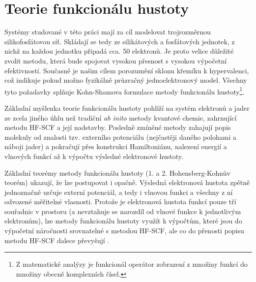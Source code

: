 \documentclass[
  digital, %
  table,   %
  lof,     %
  lot,     %
  oneside,
]{fithesis3}
\begin{document}
\section{Teorie funkcionálu hustoty}
Systémy studované v této práci mají za cíl modelovat trojrozměrnou silikofosfátovou síť. Skládají se tedy ze silikátových a fosfátových jednotek, z nichž na každou jednotku připadá cca. 50 elektronů. Je proto velice důležité zvolit metodu, která bude spojovat vysokou přesnost s vysokou výpočetní efektivností. Současně je našim cílem porozumění sklonu křemíku k hypervalenci, což indikuje pokud možno fyzikálně průzračný jednoelektronový model. Všechny tyto požadavky splňuje Kohn-Shamova formulace metody funkcionálu hustoty\footnote{Z matematické analýzy je funkcionál operátor zobrazení z množiny funkcí do množiny obecně komplexních čísel.}\cite{bickelhaupt2007kohn}.

Základní myšlenka teorie funkcionálu hustoty pohlíží na systém elektronů a jader ze zcela jiného úhlu než tradiční \textit{ab inito} metody kvantové chemie, zahrnující metodu HF-SCF a její nadstavby. Posledně zmíněné metody zahajují popis molekuly od znalosti tzv. externího potenciálu (nejčastěji daného polohami a náboji jader) a pokračují přes konstrukci Hamiltoniánu, nalezení energií a vlnových funkcí až k výpočtu výsledné elektronové hustoty.

Základní teorémy metody funkcionálu hustoty (1. a 2. Hohensberg-Kohnův teorém) ukazují, že lze postupovat i opačně. Výsledná elektronová hustota zpětně jednoznačně určuje externí potenciál, a tedy i vlnovou funkci a všechny z ní odvozené měřitelné vlasnosti. Protože je elektronová hustota funkcí pouze tří souřadnic v prostoru (a nevztahuje se narozdíl od vlnové funkce k jednotlivým elektronům), lze metody funkcionálu hustoty využít k výpočtům, které jsou do výpočetní náročnosti srovnatelné s metodou HF-SCF, ale co do přenosti popisu metodu HF-SCF dalece převyšují \cite{jensen2007introduction}.\\
\end{document}
